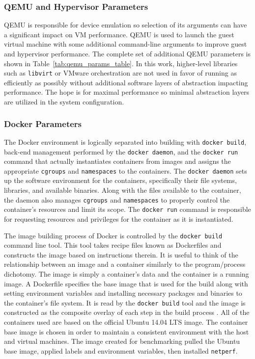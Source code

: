
\subsubsection{QEMU and Hypervisor Parameters} %
\label{ssub:qemu_params}
QEMU is responsible for device emulation so selection of its arguments can have a significant impact on VM performance.
QEMU is used to launch the guest virtual machine with some additional command-line arguments to improve guest and hypervisor performance.  
The complete set of additional QEMU parameters is shown in Table~\ref{tab:qemu_params_table}.  
In this work, higher-level libraries such as \texttt{libvirt} or VMware orchestration are not used in favor of running as efficiently as possibly without additional software layers of abstraction impacting performance.
The hope is for maximal performance so minimal abstraction layers are utilized in the system configuration.




\subsubsection{Docker Parameters} %
\label{ssub:docker_params}
The Docker environment is logically separated into building with \texttt{docker build}, back-end management performed by the \texttt{docker daemon}, and the \texttt{docker run} command that actually instantiates containers from images and assigns the appropriate \texttt{cgroups} and \texttt{namespaces} to the containers.
The \texttt{docker daemon} sets up the software environment for the containers, specifically their file systems, libraries, and available binaries.  
Along with the files available to the container, the daemon also manages \texttt{cgroups} and \texttt{namespaces} to properly control the container's resources and limit its scope.  
The \texttt{docker run} command is responsible for requesting resources and privileges for the container as it is instantiated.

The image building process of Docker is controlled by the \texttt{docker build} command line tool.  
This tool takes recipe files known as Dockerfiles \autocite{_dockerfile_1} and constructs the image based on instructions therein.
It is useful to think of the relationship between an image and a container similarly to the program/process dichotomy.
The image is simply a container's data and the container is a running image.
A Dockerfile specifies the base image that is used for the build along with setting environment variables and installing necessary packages and binaries to the container's file system. 
It is read by the \texttt{docker build} tool and the image is constructed as the composite overlay of each step in the build process \autocite{dockerbuild1}.
All of the containers used are based on the official Ubuntu 14.04 LTS image.
The container base image is chosen in order to maintain a consistent environment with the host and virtual machines.
The image created for benchmarking pulled the Ubuntu base image, applied labels and environment variables, then installed \texttt{netperf}.  

